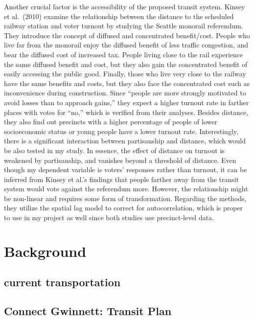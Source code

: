 \documentclass[
]{article}
\begin{document}
Another crucial factor is the accessibility of the proposed transit
system. Kinsey et al.~(2010) examine the relationship between the
distance to the scheduled railway station and voter turnout by studying
the Seattle monorail referendum. They introduce the concept of diffused
and concentrated benefit/cost. People who live far from the monorail
enjoy the diffused benefit of less traffic congestion, and bear the
diffused cost of increased tax. People living close to the rail
experience the same diffused benefit and cost, but they also gain the
concentrated benefit of easily accessing the public good. Finally, those
who live very close to the railway have the same benefits and costs, but
they also face the concentrated cost such as inconvenience during
construction. Since ``people are more strongly motivated to avoid losses
than to approach gains,'' they expect a higher turnout rate in farther
places with votes for ``no,'' which is verified from their analyses.
Besides distance, they also find out precincts with a higher percentage
of people of lower socioeconomic status or young people have a lower
turnout rate. Interestingly, there is a significant interaction between
partisanship and distance, which would be also tested in my study. In
essence, the effect of distance on turnout is weakened by partisanship,
and vanishes beyond a threshold of distance. Even though my dependent
variable is voters' responses rather than turnout, it can be inferred
from Kinsey et al.'s findings that people farther away from the transit
system would vote against the referendum more. However, the relationship
might be non-linear and requires some form of transformation. Regarding
the methods, they utilize the spatial lag model to correct for
autocorrelation, which is proper to use in my project as well since both
studies use precinct-level data.

\hypertarget{background}{%
\section{Background}\label{background}}

\hypertarget{current-transportation}{%
\subsection{current transportation}\label{current-transportation}}

\hypertarget{connect-gwinnett-transit-plan}{%
\subsection{Connect Gwinnett: Transit
Plan}\label{connect-gwinnett-transit-plan}}
\end{document}
